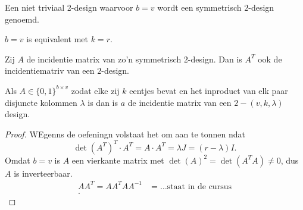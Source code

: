 \begin{definitie}
	Een niet triviaal 2-design waarvoor $b =  v$ wordt een symmetrisch $2$-design genoemd.
\end{definitie}
\begin{opmerking}
	$b = v$ is equivalent met $k = r$. 
\end{opmerking}
\begin{eigenschap}
	Zij $A$ de incidentie matrix van zo'n symmetrisch $2$-design. Dan is $A^{T}$ ook de incidentiematriv van een $2$-design.
\end{eigenschap}
\begin{oef}
	Als $A \in \{0,1\} ^{b \times v}$ zodat elke zij $k$ eentjes bevat en het inproduct van elk paar disjuncte kolommen  $\lambda$ is dan is $a$ de incidentie matrix van een  $2-(v,k,\lambda)$ design.
\end{oef}
\begin{proof}
WEgenns de oefeningn volstaat het om aan te tonnen ndat \[
	\det (A^{T})^{T} \cdot A ^{T} = A \cdot A^{T} = \lambda J = (r- \lambda)I 
.\] 	
Omdat $b = v$ is $A$ een vierkante matrix met $\det (A)^2 = \det (A^{T}A) \ne 0$, dus $A$ is inverteerbaar. 
\begin{align*}
	A A^{T} = A A^{T} A A^{-1} &=\ldots \text{staat in de cursus}  \\
.\end{align*}
\end{proof}
